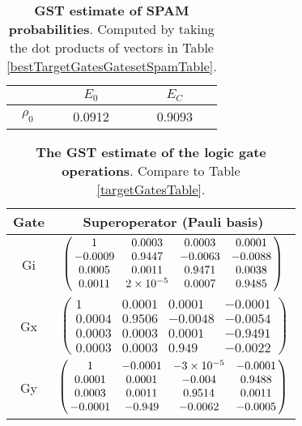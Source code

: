 {\begin{table}[h]
\begin{center}
\begin{tabular}[l]{|c|c|c|}
\hline
 & $E_{0}$ & $E_C$ \\ \hline
$\rho_{0}$ & 0.0912 & 0.9093 \\ \hline
\end{tabular}

\caption{\textbf{GST estimate of SPAM probabilities}.  Computed by taking the dot products of vectors in Table \ref{bestTargetGatesGatesetSpamTable}.\label{bestTargetGatesGatesetSpamParametersTable}}
\end{center}
\end{table}

\begin{table}[h]
\begin{center}
\begin{tabular}[l]{|c|c|}
\hline
Gate & Superoperator (Pauli basis) \\ \hline
Gi & $ \left(\!\!\begin{array}{cccc}
1 & 0.0003 & 0.0003 & 0.0001 \\ 
-0.0009 & 0.9447 & -0.0063 & -0.0088 \\ 
0.0005 & 0.0011 & 0.9471 & 0.0038 \\ 
0.0011 & 2\times 10^{-5} & 0.0007 & 0.9485
 \end{array}\!\!\right) $
 \\ \hline
Gx & $ \left(\!\!\begin{array}{cccc}
1 & 0.0001 & 0.0001 & -0.0001 \\ 
0.0004 & 0.9506 & -0.0048 & -0.0054 \\ 
0.0003 & 0.0003 & 0.0001 & -0.9491 \\ 
0.0003 & 0.0003 & 0.949 & -0.0022
 \end{array}\!\!\right) $
 \\ \hline
Gy & $ \left(\!\!\begin{array}{cccc}
1 & -0.0001 & -3\times 10^{-5} & -0.0001 \\ 
0.0001 & 0.0001 & -0.004 & 0.9488 \\ 
0.0003 & 0.0011 & 0.9514 & 0.0011 \\ 
-0.0001 & -0.949 & -0.0062 & -0.0005
 \end{array}\!\!\right) $
 \\ \hline
\end{tabular}

\caption{\textbf{The GST estimate of the logic gate operations}.  Compare to Table \ref{targetGatesTable}.\label{bestTargetGatesGatesetGatesTable}}
\end{center}
\end{table}

}
